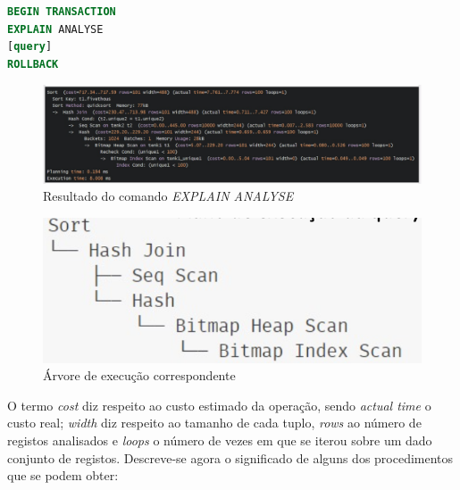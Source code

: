 \documentclass[oneside]{book}
\theoremstyle{definition}
\begin{document}
\begin{lstlisting}[language=SQL, morekeywords={CALL, DECLARE, PROCEDURE, IF, EXPLAIN, ANALYSE}, framesep=8pt, xleftmargin=40pt, framexleftmargin=40pt, frame=tb, framerule=0pt]
BEGIN TRANSACTION
EXPLAIN ANALYSE 
[query]
ROLLBACK
\end{lstlisting}

\begin{figure}[H]
    \centering
    \includegraphics[scale = 0.6]{cap_indices/explain.png}
    \caption{Resultado do comando \textit{EXPLAIN ANALYSE}}
\end{figure}

\begin{figure}[H]
    \centering
    \includegraphics[scale = 0.5]{cap_indices/arvore_explain.png}
    \caption{Árvore de execução correspondente}
\end{figure}

O termo \textit{cost} diz respeito ao custo estimado da operação, sendo \textit{actual time} o custo real; \textit{width} diz respeito ao tamanho de cada tuplo, \textit{rows} ao número de registos analisados e \textit{loops} o número de vezes em que se iterou sobre um dado conjunto de registos. Descreve-se agora o significado de alguns dos procedimentos que se podem obter:
\end{document}

